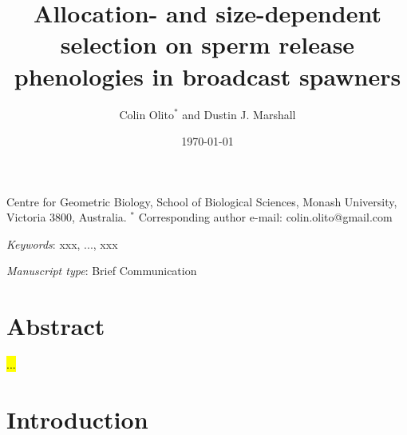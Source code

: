 \documentclass{article}
\title{Allocation- and size-dependent selection on sperm release phenologies in broadcast spawners}
\author{Colin Olito$^{\ast}$ and Dustin J. Marshall}
\date{\today}
\begin{document}
\maketitle


\noindent{} Centre for Geometric Biology, School of Biological Sciences, Monash University, Victoria 3800, Australia.
\noindent{} $^\ast$ Corresponding author e-mail: colin.olito@gmail.com

\bigskip

\noindent{} \textit{Keywords}: xxx, ..., xxx

\bigskip

\noindent{} \textit{Manuscript type}: Brief Communication

\bigskip


\linenumbers
\modulolinenumbers[1]
\renewcommand\linenumberfont{\normalfont\small}


\newpage{}
\section*{Abstract}

\noindent{} \hl{...}

\section*{Introduction}
\end{document}
